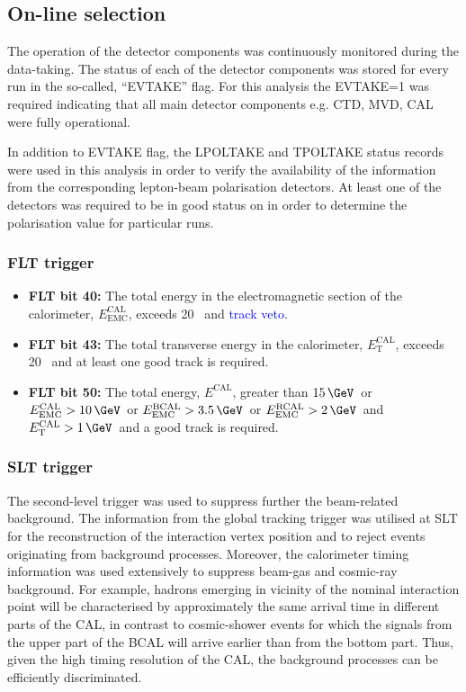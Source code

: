 \subsection{On-line selection}
\label{subsec:onlineselect}
The operation of the detector components was continuously monitored during the data-taking. The status of each of the detector components was stored for every run in the so-called, ``EVTAKE'' flag. For this analysis the EVTAKE=1 was required indicating that all main detector components e.g. CTD, MVD, CAL were fully operational.

In addition to EVTAKE flag, the LPOLTAKE and TPOLTAKE status records were used in this analysis in order to verify the availability of the information from the corresponding lepton-beam polarisation detectors. At least one of the detectors was required to be in good status on in order to determine the polarisation value for particular runs.
\subsubsection{FLT trigger}
\label{subsubsec:fltcuts}
\begin{itemize}
	\item \textbf{FLT bit 40:} The total energy in the electromagnetic section of the calorimeter, $E_\text{EMC}^\text{CAL}$, exceeds 20 \GeV\, and \textcolor{blue}{track veto}.
	\item \textbf{FLT bit 43:} The total transverse energy in the calorimeter, $E_\text{T}^\text{CAL}$, exceeds 20 \GeV\, and at least one good track is required.
	\item \textbf{FLT bit 50:} The total energy, $E^\text{CAL}$, greater than $15\, \GeV$\, or $E_\text{EMC}^\text{CAL} > 10\, \GeV\,$ or $E_\text{EMC}^\text{BCAL} > 3.5\, \GeV$\, or $E_\text{EMC}^\text{RCAL} > 2\, \GeV$\, and $E_\text{T}^\text{CAL} > 1\, \GeV$\, and a good track is required.
\end{itemize}

\subsubsection{SLT trigger}
\label{subsubsec:sltcuts}
The second-level trigger was used to suppress further the beam-related background. The information from the \zeus global tracking trigger was utilised at SLT for the reconstruction of the interaction vertex position and to reject events originating from background processes. Moreover, the calorimeter timing information was used extensively to suppress beam-gas and cosmic-ray background. For example, hadrons emerging in vicinity of the nominal interaction point will be characterised by approximately the same arrival time in different parts of the CAL, in contrast to cosmic-shower events for which the signals from the upper part of the BCAL will arrive earlier than from the bottom part. Thus, given the high timing resolution of the CAL, the background processes can be efficiently discriminated.

